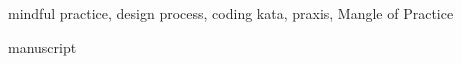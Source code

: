 \begin{keywords}
	mindful practice, design process, coding kata, praxis, Mangle of Practice
\end{keywords}


{manuscript}






